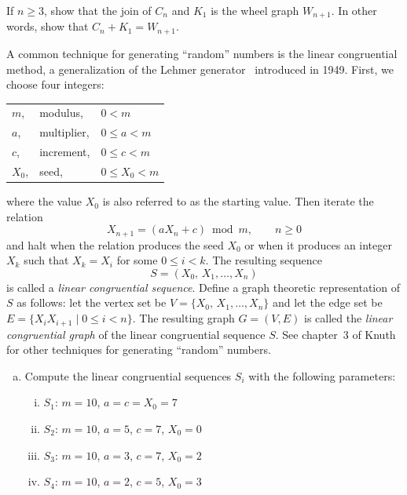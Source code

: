 \begin{problem}
\item If $n \geq 3$, show that the join of $C_n$ and $K_1$ is the
  wheel graph $W_{n+1}$. In other words, show that $C_n + K_1 = W_{n+1}$.

\item A common technique for generating
  ``random'' numbers is the linear
  congruential method, a generalization of the
  Lehmer generator~\cite{Lehmer1949} introduced
  in 1949. First, we choose four integers:
  \begin{center}
  \begin{tabular}{lll}
  $m$,   & modulus,    & $0 < m$ \\[4pt]
  $a$,   & multiplier, & $0 \leq a < m$ \\[4pt]
  $c$,   & increment,  & $0 \leq c < m$ \\[4pt]
  $X_0$, & seed,       & $0 \leq X_0 < m$
  \end{tabular}
  \end{center}
  where the value $X_0$ is also referred to as the starting
  value. Then iterate the relation
  \[
  X_{n+1}
  =
  (a X_n + c) \bmod m,\qquad n \geq 0
  \]
  and halt when the relation produces the seed $X_0$ or when it
  produces an integer $X_k$ such that $X_k = X_i$ for some
  $0 \leq i < k$. The resulting sequence
  \[
  S
  =
  (X_0,\, X_1, \dots, X_n)
  \]
  is called a \emph{linear congruential sequence}. Define a graph
  theoretic representation of $S$ as follows: let the vertex set be
  $V = \{X_0,\, X_1, \dots, X_n\}$ and let the edge set be
  $E = \{X_i X_{i+1} \mid 0 \leq i < n\}$. The resulting graph
  $G = (V,E)$ is called the \emph{linear congruential graph} of the
  linear congruential sequence $S$. See chapter~3 of
  Knuth~\cite{Knuth1998b} for other techniques
  for generating ``random'' numbers.
  \begin{enumerate}[(a)]
  \item Compute the linear congruential sequences $S_i$ with the
    following parameters:
    \begin{enumerate}[(i)]
    \item $S_1$: $m = 10$, $a = c = X_0 = 7$

    \item $S_2$: $m = 10$, $a = 5$, $c = 7$, $X_0 = 0$

    \item $S_3$: $m = 10$, $a = 3$, $c = 7$, $X_0 = 2$

    \item $S_4$: $m = 10$, $a = 2$, $c = 5$, $X_0 = 3$
    \end{enumerate}


\end{enumerate}
\end{problem}
